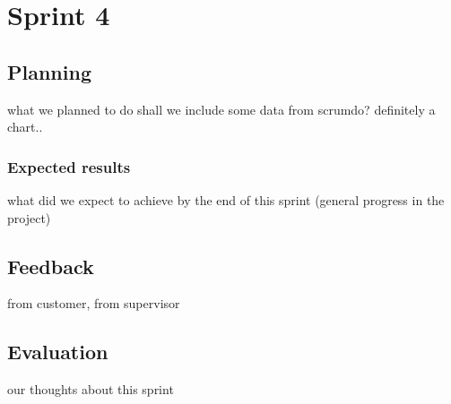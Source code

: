 
\chapter{Sprint 4} %

\label{Sprint 4} %


\section{Planning}
what we planned to do
shall we include some data from scrumdo? definitely a chart..
\subsection{Expected results}
what did we expect to achieve by the end of this sprint (general progress in the project)
\section{Feedback}
from customer, from supervisor
\section{Evaluation}
our thoughts about this sprint